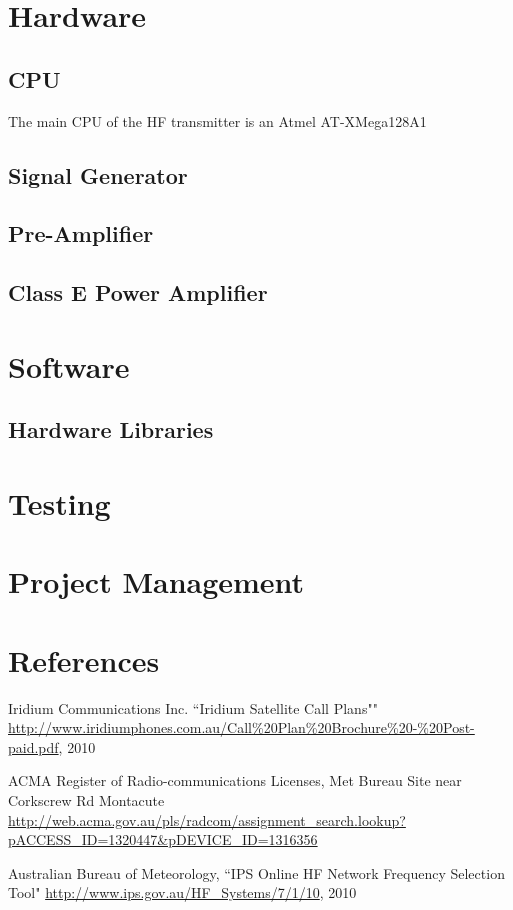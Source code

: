 \documentclass[a4paper,12pt]{article}
\begin{document}
\section{Hardware}

\subsection{CPU}
The main CPU of the HF transmitter is an Atmel AT-XMega128A1

\subsection{Signal Generator}

\subsection{Pre-Amplifier}

\subsection{Class E Power Amplifier}


\section{Software}

\subsection{Hardware Libraries}

\section{Testing}

\section{Project Management}

\section{References}
\renewcommand*{\refname}{\vspace*{-12mm}}
\begin{thebibliography}{99}
Iridium Communications Inc. ``Iridium Satellite Call Plans"" \url{http://www.iridiumphones.com.au/Call\%20Plan\%20Brochure\%20-\%20Post-paid.pdf}, 2010

ACMA Register of Radio-communications Licenses, Met Bureau Site near Corkscrew Rd Montacute \url{http://web.acma.gov.au/pls/radcom/assignment\_search.lookup?pACCESS\_ID=1320447&pDEVICE\_ID=1316356}

Australian Bureau of Meteorology, ``IPS Online HF Network Frequency Selection Tool" \url{http://www.ips.gov.au/HF\_Systems/7/1/10}, 2010 %



\end{thebibliography}
\end{document}

